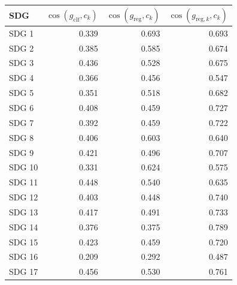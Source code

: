 \begin{tabular}{lrrr}
\toprule
SDG & $\cos(g_{\mathrm{clf}}, c_k)$ & $\cos(g_{\mathrm{reg}}, c_k)$ & $\cos(g_{\mathrm{reg},k}, c_k)$ \\
\midrule
SDG 1 & 0.339 & 0.693 & 0.693 \\
SDG 2 & 0.385 & 0.585 & 0.674 \\
SDG 3 & 0.436 & 0.528 & 0.675 \\
SDG 4 & 0.366 & 0.456 & 0.547 \\
SDG 5 & 0.351 & 0.518 & 0.682 \\
SDG 6 & 0.408 & 0.459 & 0.727 \\
SDG 7 & 0.392 & 0.459 & 0.722 \\
SDG 8 & 0.406 & 0.603 & 0.640 \\
SDG 9 & 0.421 & 0.496 & 0.707 \\
SDG 10 & 0.331 & 0.624 & 0.575 \\
SDG 11 & 0.448 & 0.540 & 0.635 \\
SDG 12 & 0.403 & 0.448 & 0.740 \\
SDG 13 & 0.417 & 0.491 & 0.733 \\
SDG 14 & 0.376 & 0.375 & 0.789 \\
SDG 15 & 0.423 & 0.459 & 0.720 \\
SDG 16 & 0.209 & 0.292 & 0.487 \\
SDG 17 & 0.456 & 0.530 & 0.761 \\
\bottomrule
\end{tabular}
